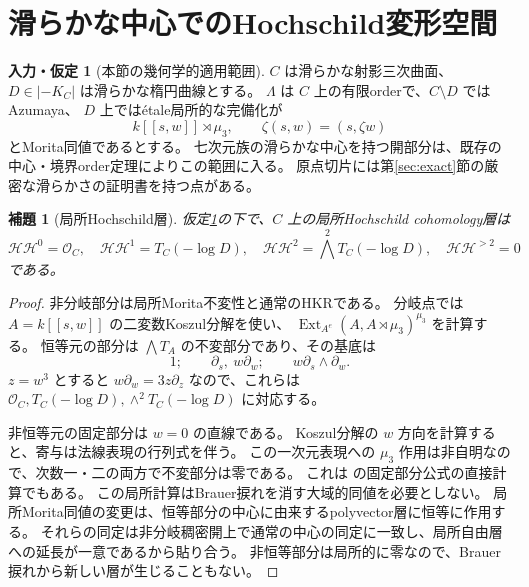 \documentclass[11pt,a4paper]{ltjsarticle}
\newtheorem{lemma}[theorem]{補題}
\theoremstyle{definition}\newtheorem{definition}[theorem]{定義}
\newtheorem{assumption}[theorem]{入力・仮定}
\theoremstyle{remark}\newtheorem{remark}[theorem]{注意}
\newcommand{\Ext}{\operatorname{Ext}}
\newcommand{\OO}{\mathcal O}
\begin{document}
\section{滑らかな中心でのHochschild変形空間}\label{sec:hh}
\begin{assumption}[本節の幾何学的適用範囲]\label{ass:order}
$C$ は滑らかな射影三次曲面、$D\in|-K_C|$ は滑らかな楕円曲線とする。
$\Lambda$ は $C$ 上の有限orderで、$C\setminus D$ ではAzumaya、
$D$ 上では\'{e}tale局所的な完備化が
\[
k[[s,w]]\rtimes\mu_3,\qquad \zeta(s,w)=(s,\zeta w)
\]
とMorita同値であるとする。
七次元族の滑らかな中心を持つ開部分は、既存の中心・境界order定理によりこの範囲に入る。
原点切片には第\ref{sec:exact}節の厳密な滑らかさの証明書を持つ点がある。
\end{assumption}

\begin{lemma}[局所Hochschild層]\label{lem:local-HH}
仮定\ref{ass:order}の下で、$C$ 上の局所Hochschild cohomology層は
\[
\mathcal{HH}^0=\OO_C,\quad
\mathcal{HH}^1=T_C(-\log D),\quad
\mathcal{HH}^2=\bigwedge^2T_C(-\log D),\quad
\mathcal{HH}^{>2}=0
\]
である。
\end{lemma}
\begin{proof}
非分岐部分は局所Morita不変性と通常のHKRである。
分岐点では $A=k[[s,w]]$ の二変数Koszul分解を使い、
$\Ext_{A^e}(A,A\rtimes\mu_3)^{\mu_3}$ を計算する。
恒等元の部分は $\bigwedge T_A$ の不変部分であり、その基底は
\[
1;\qquad \partial_s,\ w\partial_w;\qquad w\partial_s\wedge\partial_w.
\]
$z=w^3$ とすると $w\partial_w=3z\partial_z$ なので、これらは
$\OO_C,T_C(-\log D),\wedge^2T_C(-\log D)$ に対応する。

非恒等元の固定部分は $w=0$ の直線である。
Koszul分解の $w$ 方向を計算すると、寄与は法線表現の行列式を伴う。
この一次元表現への $\mu_3$ 作用は非自明なので、次数一・二の両方で不変部分は零である。
これは \cite[Theorem 1.1]{NS} の固定部分公式の直接計算でもある。
この局所計算はBrauer捩れを消す大域的同値を必要としない。
局所Morita同値の変更は、恒等部分の中心に由来するpolyvector層に恒等に作用する。
それらの同定は非分岐稠密開上で通常の中心の同定に一致し、局所自由層への延長が一意であるから貼り合う。
非恒等部分は局所的に零なので、Brauer捩れから新しい層が生じることもない。
\end{proof}
\end{document}
